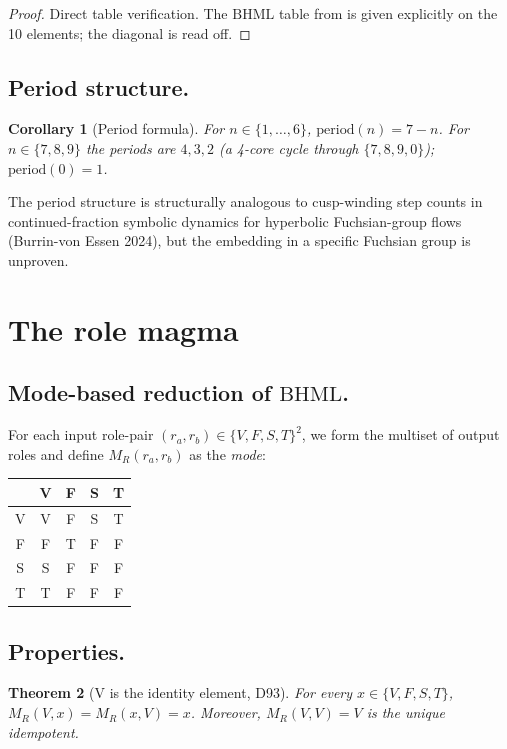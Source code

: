 \documentclass[11pt,reqno]{amsart}
\theoremstyle{plain}
\newtheorem{theorem}{Theorem}[section]
\newtheorem{corollary}[theorem]{Corollary}
\theoremstyle{definition}
\theoremstyle{remark}
\newcommand{\BH}{\mathrm{BHML}}
\begin{document}
\begin{proof}
Direct table verification. The $\BH$ table from
\cite{SandersGishFourCore} is given explicitly on the 10 elements;
the diagonal is read off.
\end{proof}

\subsection{Period structure.}
\begin{corollary}[Period formula]
For $n \in \{1, \ldots, 6\}$, $\mathrm{period}(n) = 7 - n$. For
$n \in \{7, 8, 9\}$ the periods are $4, 3, 2$ (a 4-core cycle through
$\{7, 8, 9, 0\}$); $\mathrm{period}(0) = 1$.
\end{corollary}

The period structure is structurally analogous to cusp-winding step
counts in continued-fraction symbolic dynamics for hyperbolic
Fuchsian-group flows (Burrin-von Essen 2024), but the embedding in a
specific Fuchsian group is unproven.

\section{The role magma}

\subsection{Mode-based reduction of $\BH$.}
For each input role-pair $(r_{a}, r_{b}) \in \{V, F, S, T\}^{2}$, we
form the multiset of output roles and define $M_{R}(r_{a}, r_{b})$ as
the \emph{mode}:
\begin{center}
\begin{tabular}{c|cccc}
   & V & F & S & T \\ \hline
V & V & F & S & T \\
F & F & T & F & F \\
S & S & F & F & F \\
T & T & F & F & F
\end{tabular}
\end{center}

\subsection{Properties.}
\begin{theorem}[V is the identity element, D93]\label{thm:V-identity}
For every $x \in \{V, F, S, T\}$,
$M_{R}(V, x) = M_{R}(x, V) = x$. Moreover, $M_{R}(V, V) = V$ is the
unique idempotent.
\end{theorem}
\end{document}
